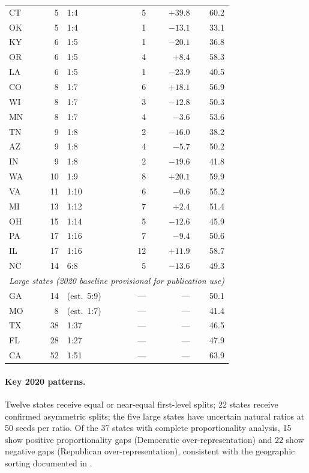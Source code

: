 \begin{table}[h]
\begin{tabular}{l r l r r r}
CT  &  5 & 1:4  &  5 & $+39.8$ & 60.2 \\
OK  &  5 & 1:4  &  1 & $-13.1$ & 33.1 \\
KY  &  6 & 1:5  &  1 & $-20.1$ & 36.8 \\
OR  &  6 & 1:5  &  4 & $+8.4$  & 58.3 \\
LA  &  6 & 1:5  &  1 & $-23.9$ & 40.5 \\
CO  &  8 & 1:7  &  6 & $+18.1$ & 56.9 \\
WI  &  8 & 1:7  &  3 & $-12.8$ & 50.3 \\
MN  &  8 & 1:7  &  4 & $-3.6$  & 53.6 \\
TN  &  9 & 1:8  &  2 & $-16.0$ & 38.2 \\
AZ  &  9 & 1:8  &  4 & $-5.7$  & 50.2 \\
IN  &  9 & 1:8  &  2 & $-19.6$ & 41.8 \\
WA  & 10 & 1:9  &  8 & $+20.1$ & 59.9 \\
VA  & 11 & 1:10 &  6 & $-0.6$  & 55.2 \\
MI  & 13 & 1:12 &  7 & $+2.4$  & 51.4 \\
OH  & 15 & 1:14 &  5 & $-12.6$ & 45.9 \\
PA  & 17 & 1:16 &  7 & $-9.4$  & 50.6 \\
IL  & 17 & 1:16 & 12 & $+11.9$ & 58.7 \\
NC  & 14 & 6:8  &  5 & $-13.6$ & 49.3 \\
\midrule
\multicolumn{6}{l}{\textit{Large states (2020 baseline provisional for publication use)}} \\
GA  & 14 & (est.\ 5:9) & --- & --- & 50.1 \\
MO  &  8 & (est.\ 1:7) & --- & --- & 41.4 \\
TX  & 38 & 1:37 & --- & --- & 46.5 \\
FL  & 28 & 1:27 & --- & --- & 47.9 \\
CA  & 52 & 1:51 & --- & --- & 63.9 \\
\bottomrule
\end{tabular}
\end{table}

\paragraph{Key 2020 patterns.}
Twelve states receive equal or near-equal first-level splits;
22 states receive confirmed asymmetric splits;
the five large states have uncertain natural ratios at 50 seeds per ratio.
Of the 37 states with complete proportionality analysis, 15 show positive
proportionality gaps (Democratic over-representation) and 22 show negative
gaps (Republican over-representation), consistent with the geographic sorting
documented in \citet{rodden2019}.

